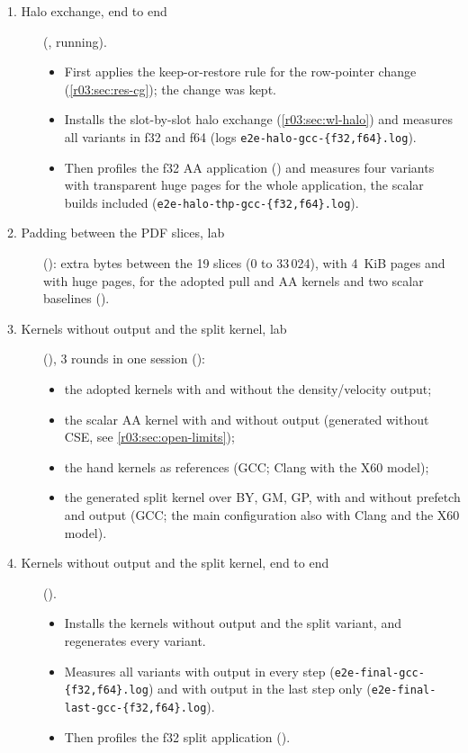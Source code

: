 \begin{r03pending}
\begin{description}
  \item[1. Halo exchange, end to end] (, running).
        \begin{itemize}
          \item First applies the keep-or-restore rule for the row-pointer change
                (\cref{r03:sec:res-cg}); the change was kept.
          \item Installs the slot-by-slot halo exchange (\cref{r03:sec:wl-halo}) and measures
                all variants in f32 and f64 (logs \texttt{e2e-halo-gcc-\{f32,f64\}.log}).
          \item Then profiles the f32 AA application () and measures four
                variants with transparent huge pages for the whole application, the scalar builds
                included (\texttt{e2e-halo-thp-gcc-\{f32,f64\}.log}).
        \end{itemize}
  \item[2. Padding between the PDF slices, lab] (): extra
        bytes between the 19 slices (0 to 33\,024), with 4~KiB pages and with huge pages, for the
        adopted pull and AA kernels and two scalar baselines ().
  \item[3. Kernels without output and the split kernel, lab] (),
        3 rounds in one session ():
        \begin{itemize}
          \item the adopted kernels with and without the density/velocity output;
          \item the scalar AA kernel with and without output (generated without CSE, see
                \cref{r03:sec:open-limits});
          \item the hand kernels as references (GCC; Clang with the X60 model);
          \item the generated split kernel over BY, GM, GP, with and without prefetch and output
                (GCC; the main configuration also with Clang and the X60 model).
        \end{itemize}
  \item[4. Kernels without output and the split kernel, end to end]
        ().
        \begin{itemize}
          \item Installs the kernels without output and the split variant, and regenerates every
                variant.
          \item Measures all variants with output in every step
                (\texttt{e2e-final-gcc-\{f32,f64\}.log}) and with output in the last step only
                (\texttt{e2e-final-last-gcc-\{f32,f64\}.log}).
          \item Then profiles the f32 split application ().
        \end{itemize}
\end{description}
\end{r03pending}

